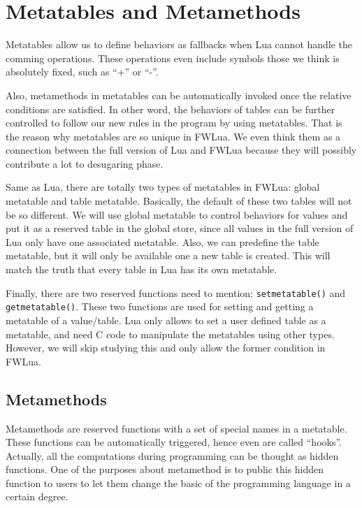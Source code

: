 \newcommand{\abFunction}[2]{{\tt function} ~{#1}~{\tt return}~{#2}~{\tt end}}
\newcommand{\semanticFullRaw}[4]{{#1},{#2} \Downarrow {#3},{#4}}
\newcommand{\semanticFull}[4]{{#1},{#2} \Downarrow {#3}, {#4}}


\section{Metatables and Metamethods}
Metatables allow us to define behaviors as fallbacks when Lua cannot handle the comming operations. These operations even include symbols those we think is absolutely fixed, such as ``+'' or ``-''.

Also, metamethods in metatables can be automatically invoked once the relative conditions are satisfied. In other word, the behaviors of tables can be further controlled to follow our new rules in the program by using metatables. That is the reason why metatables are so unique in FWLua. We even think them as a connection between the full version of Lua and FWLua because they will possibly contribute a lot to desugaring phase.

Same as Lua, there are totally two types of metatables in FWLua: global metatable and table metatable. Basically, the default of these two tables will not be so different. We will use global metatable to control behaviors for values and put it as a reserved table in the global store, since all values in the full version of Lua only have one associated metatable. Also, we can predefine the table metatable, but it will only be available one a new table is created. This will match the truth that every table in Lua has its own metatable.

Finally, there are two reserved functions need to mention: {\tt setmetatable()} and {\tt getmetatable()}. These two functions are used for setting and getting a metatable of a value/table. %
Lua only allows to set a user defined table as a metatable, and need C code to manipulate the metatables using other types. However, we will skip studying this and only allow the former condition in FWLua.

\subsection{Metamethods}
Metamethods are reserved functions with a set of special names in a metatable. These functions can be automatically triggered, hence even are called ``hooks''. Actually, all the computations during programming can be thought as hidden functions. One of the purposes about metamethod is to public this hidden function to users to let them change the basic of the programming language in a certain degree.

